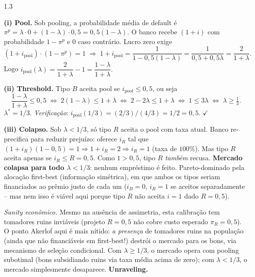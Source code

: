 \documentclass[11pt,addpoints]{exam}
\begin{document}
\begin{spacing}{1.3}
\begin{questions}
\begin{parts}
\begin{solution}
\textbf{(i) Pool.} Sob pooling, a probabilidade média de default é $\pi^p = \lambda \cdot 0 + (1-\lambda)\cdot 0{,}5 = 0{,}5(1-\lambda)$. O banco recebe $(1+i)$ com probabilidade $1 - \pi^p$ e $0$ caso contrário. Lucro zero exige
\[
    (1 + i_{\text{pool}})\cdot (1 - \pi^p) = 1 \;\Longrightarrow\; 1 + i_{\text{pool}} = \frac{1}{1 - 0{,}5(1-\lambda)} = \frac{1}{0{,}5 + 0{,}5\lambda} = \frac{2}{1+\lambda}.
\]
Logo $\boxed{i_{\text{pool}}(\lambda) = \dfrac{2}{1+\lambda} - 1 = \dfrac{1-\lambda}{1+\lambda}.}$

\textbf{(ii) Threshold.} Tipo $B$ aceita pool se $i_{\text{pool}} \leq 0{,}5$, ou seja
\[
    \frac{1-\lambda}{1+\lambda} \leq 0{,}5 \;\Longleftrightarrow\; 2(1-\lambda) \leq 1 + \lambda \;\Longleftrightarrow\; 2 - 2\lambda \leq 1 + \lambda \;\Longleftrightarrow\; 1 \leq 3\lambda \;\Longleftrightarrow\; \lambda \geq \tfrac{1}{3}.
\]
$\boxed{\lambda^* = 1/3.}$ \emph{Verificação}: $i_{\text{pool}}(1/3) = (2/3)/(4/3) = 1/2 = 0{,}5$. $\checkmark$

\textbf{(iii) Colapso.} Sob $\lambda < 1/3$, só tipo $R$ aceita o pool com taxa atual. Banco re-precifica para reduzir prejuízo: oferece $i_R$ tal que $(1 + i_R)(1 - 0{,}5) = 1 \Rightarrow 1 + i_R = 2 \Rightarrow i_R = 1$ (taxa de $100\%$). Mas tipo $R$ aceita apenas se $i_R \leq R = 0{,}5$. Como $1 > 0{,}5$, tipo $R$ \emph{também} recusa. \textbf{Mercado colapsa para todo $\lambda < 1/3$}: nenhum empréstimo é feito. Pareto-dominado pela alocação first-best (informação simétrica), em que ambos os tipos seriam financiados ao prêmio justo de cada um ($i_B = 0$, $i_R = 1$ se aceitos separadamente -- mas nem isso é viável aqui porque tipo $R$ não aceita $i = 1$ dado $R = 0{,}5$).

\emph{Sanity econômico.} Mesmo na ausência de assimetria, esta calibração tem tomadores ruins inviáveis (projeto $R = 0{,}5$ não cobre custo esperado $\pi_R = 0{,}5$). O ponto Akerlof aqui é mais nítido: \emph{a presença} de tomadores ruins na população (ainda que não financiáveis em first-best!) destrói o mercado para os bons, via mecanismo de seleção condicional. Com $\lambda \geq 1/3$, o mercado opera com pooling subotimal (bons subsidiando ruins via taxa média acima de zero); com $\lambda < 1/3$, o mercado simplesmente desaparece. \textbf{Unraveling.}


\end{solution}
\end{parts}
\end{questions}
\end{spacing}
\end{document}
